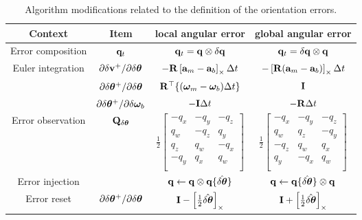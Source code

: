 \begin{table*}[tb]
\renewcommand{\arraystretch}{1.7}
\caption{Algorithm modifications related to the definition of the orientation errors.}
\label{tab:local_to_global}
\vspace{1ex}
\centering
\begin{tabular}{|c|c|c|c|}
\hline
Context & Item & local angular error & global angular error \\
\hline
\hline
Error composition & ${\bf q}_t$ & ${\bf q}_t = {\bf q}\otimes\delta{\bf q}$ & ${\bf q}_t = \delta{\bf q}\otimes{\bf q}$ \\
\hline
\hline
\multirow{3}{*}{Euler integration} & $\partial\delta{\bf v}^+/\partial\delta{\bm \theta}$ & $-{\bf R}\left[{\bf a}_m-{\bf a}_b\right]_\times\Delta t$ & $-\left[{\bf R}({\bf a}_m-{\bf a}_b)\right]_\times\Delta t$ \\
&$\partial\delta{\bm \theta}^+/\partial\delta{\bm \theta}$ & ${\bf R}^{\top}\{({\bm \omega}_m-{\bm \omega}_b)\Delta t\}$ & ${\bf I}$ \\
&$\partial\delta{\bm \theta}^+/\partial\delta{\bm \omega}_b$ & $-{\bf I}\Delta t$ &  $-{\bf R}\Delta t$ \\
\hline
\hline
Error observation & $
{\bf Q}_{\delta{\bm \theta}}
$ & $\frac12\begin{bmatrix}
-q_x &-q_y &-q_z\\
 q_w &-q_z & q_y\\
 q_z & q_w &-q_x\\
-q_y & q_x & q_w\\
\end{bmatrix}$ & $\frac12\begin{bmatrix}
-q_x &-q_y &-q_z\\
 q_w & q_z &-q_y\\
-q_z & q_w & q_x\\
 q_y &-q_x & q_w\\
\end{bmatrix}$ \\
\hline
Error injection &  %
& ${\bf q} \gets {\bf q} \otimes {\bf q}\{\hat{\delta{\bm \theta}}\}$ & ${\bf q} \gets {\bf q}\{\hat{\delta{\bm \theta}}\} \otimes {\bf q}$ \\ 
\hline
Error reset & $\partial\delta{\bm \theta}^+/\partial\delta{\bm \theta}$ & ${\bf I} - \left[\frac12\hat{\delta{\bm \theta}}\right]_\times$ & ${\bf I} + \left[\frac12\hat{\delta{\bm \theta}}\right]_\times$ \\
\hline
\end{tabular}
\end{table*}
